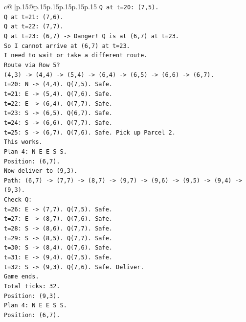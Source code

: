 \documentclass{article}
\begin{document}
{\begin{supertabular}{c@{$\;$}|p{.15\linewidth}@{}p{.15\linewidth}p{.15\linewidth}p{.15\linewidth}p{.15\linewidth}p{.15\linewidth}}
{{{\texttt{Q at t=20: (7,5).} \\
\texttt{Q at t=21: (7,6).} \\
\texttt{Q at t=22: (7,7).} \\
\texttt{Q at t=23: (6,7) {-}> Danger! Q is at (6,7) at t=23.} \\
\texttt{So I cannot arrive at (6,7) at t=23.} \\
\texttt{I need to wait or take a different route.} \\
\texttt{Route via Row 5?} \\
\texttt{(4,3) {-}> (4,4) {-}> (5,4) {-}> (6,4) {-}> (6,5) {-}> (6,6) {-}> (6,7).} \\
\texttt{t=20: N {-}> (4,4). Q(7,5). Safe.} \\
\texttt{t=21: E {-}> (5,4). Q(7,6). Safe.} \\
\texttt{t=22: E {-}> (6,4). Q(7,7). Safe.} \\
\texttt{t=23: S {-}> (6,5). Q(6,7). Safe.} \\
\texttt{t=24: S {-}> (6,6). Q(7,7). Safe.} \\
\texttt{t=25: S {-}> (6,7). Q(7,6). Safe. Pick up Parcel 2.} \\
\texttt{This works.} \\
\texttt{Plan 4: N E E S S.} \\
\texttt{Position: (6,7).} \\
\texttt{Now deliver to (9,3).} \\
\texttt{Path: (6,7) {-}> (7,7) {-}> (8,7) {-}> (9,7) {-}> (9,6) {-}> (9,5) {-}> (9,4) {-}> (9,3).} \\
\texttt{Check Q:} \\
\texttt{t=26: E {-}> (7,7). Q(7,5). Safe.} \\
\texttt{t=27: E {-}> (8,7). Q(7,6). Safe.} \\
\texttt{t=28: S {-}> (8,6). Q(7,7). Safe.} \\
\texttt{t=29: S {-}> (8,5). Q(7,7). Safe.} \\
\texttt{t=30: S {-}> (8,4). Q(7,6). Safe.} \\
\texttt{t=31: E {-}> (9,4). Q(7,5). Safe.} \\
\texttt{t=32: S {-}> (9,3). Q(7,6). Safe. Deliver.} \\
\texttt{Game ends.} \\
\texttt{Total ticks: 32.} \\
\texttt{Position: (9,3).} \\
\texttt{Plan 4: N E E S S.} \\
\texttt{Position: (6,7).} \\
}}}
\end{supertabular}}
\end{document}
